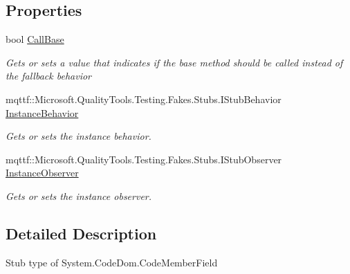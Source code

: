 \subsection*{Properties}
\begin{DoxyCompactItemize}
\item 
bool \hyperlink{class_system_1_1_code_dom_1_1_fakes_1_1_stub_code_member_field_a56f30366af374688f1c79f82e4df8496}{Call\-Base}
\begin{DoxyCompactList}\small\item\em Gets or sets a value that indicates if the base method should be called instead of the fallback behavior\end{DoxyCompactList}\item 
mqttf\-::\-Microsoft.\-Quality\-Tools.\-Testing.\-Fakes.\-Stubs.\-I\-Stub\-Behavior \hyperlink{class_system_1_1_code_dom_1_1_fakes_1_1_stub_code_member_field_aec3f3d7c4a97899febafae05005fe14f}{Instance\-Behavior}
\begin{DoxyCompactList}\small\item\em Gets or sets the instance behavior.\end{DoxyCompactList}\item 
mqttf\-::\-Microsoft.\-Quality\-Tools.\-Testing.\-Fakes.\-Stubs.\-I\-Stub\-Observer \hyperlink{class_system_1_1_code_dom_1_1_fakes_1_1_stub_code_member_field_ac1d65afda15e7b54bf0f52475c367019}{Instance\-Observer}
\begin{DoxyCompactList}\small\item\em Gets or sets the instance observer.\end{DoxyCompactList}\end{DoxyCompactItemize}


\subsection{Detailed Description}
Stub type of System.\-Code\-Dom.\-Code\-Member\-Field



